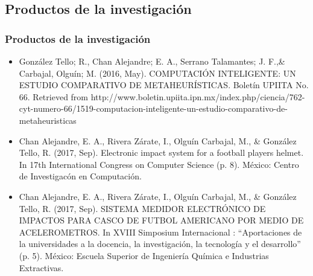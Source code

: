 \subsection{Productos de la investigaci\'{o}n}
\begin{frame}
\frametitle{Productos de la investigaci\'{o}n}

\begin{itemize}
\scriptsize
\item {Gonz\'alez Tello; R., Chan Alejandre; E. A., Serrano Talamantes; J. 
 F.,\& Carbajal, Olgu\'in; M. (2016, May). COMPUTACI\'ON INTELIGENTE: UN 
 ESTUDIO COMPARATIVO DE METAHEUR\'ISTICAS. Bolet\'in UPIITA No. 66. Retrieved 
 from http://www.boletin.upiita.ipn.mx/index.php/ciencia/762-cyt-numero-66/1519-computacion-inteligente-un-estudio-comparativo-de-metaheuristicas}

\item {Chan Alejandre, E. A., Rivera Z\'arate, I., Olgu\'in Carbajal, M., \&
 Gonz\'alez Tello, R. (2017, Sep). Electronic impact system for a football 
 player\textsc{}s helmet. In 17th International Congress on Computer 
 Science (p. 8). M\'exico: Centro de Investigac\'on en Computaci\'on.}

\item {Chan Alejandre, E. A., Rivera Z\'arate, I., Olgu\'in Carbajal, M., \& 
 Gonz\'alez Tello, R. (2017, Sep). SISTEMA MEDIDOR ELECTR\'ONICO DE IMPACTOS 
 PARA CASCO DE FUTBOL AMERICANO POR MEDIO DE ACELEROMETROS. In XVIII 
 Simposium Internacional : ``Aportaciones de la universidades a la docencia, 
 la investigaci\'on, la tecnolog\'ia y el desarrollo'' (p. 5). M\'exico: 
 Escuela Superior de Ingenier\'ia Qu\'imica e Industrias Extractivas.}
 
\end{itemize}


\end{frame}